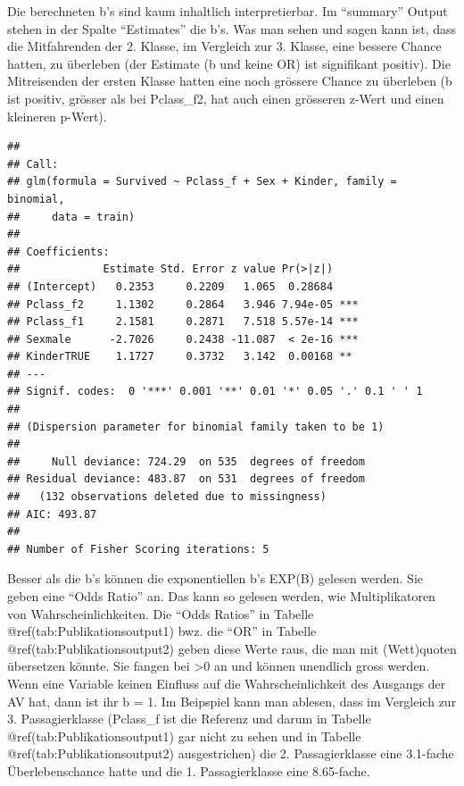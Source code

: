 \documentclass[
  10pt,
  letterpaper,
  a4paper, twoside]{scrreprt}
\begin{document}
Die berechneten b's sind kaum inhaltlich interpretierbar. Im
\enquote{summary} Output stehen in der Spalte \enquote{Estimates} die
b's. Was man sehen und sagen kann ist, dass die Mitfahrenden der 2.
Klasse, im Vergleich zur 3. Klasse, eine bessere Chance hatten, zu
überleben (der Estimate (b und keine OR) ist signifikant positiv). Die
Mitreisenden der ersten Klasse hatten eine noch grössere Chance zu
überleben (b ist positiv, grösser als bei Pclass\_f2, hat auch einen
grösseren z-Wert und einen kleineren p-Wert).

\begin{verbatim}
## 
## Call:
## glm(formula = Survived ~ Pclass_f + Sex + Kinder, family = binomial, 
##     data = train)
## 
## Coefficients:
##             Estimate Std. Error z value Pr(>|z|)    
## (Intercept)   0.2353     0.2209   1.065  0.28684    
## Pclass_f2     1.1302     0.2864   3.946 7.94e-05 ***
## Pclass_f1     2.1581     0.2871   7.518 5.57e-14 ***
## Sexmale      -2.7026     0.2438 -11.087  < 2e-16 ***
## KinderTRUE    1.1727     0.3732   3.142  0.00168 ** 
## ---
## Signif. codes:  0 '***' 0.001 '**' 0.01 '*' 0.05 '.' 0.1 ' ' 1
## 
## (Dispersion parameter for binomial family taken to be 1)
## 
##     Null deviance: 724.29  on 535  degrees of freedom
## Residual deviance: 483.87  on 531  degrees of freedom
##   (132 observations deleted due to missingness)
## AIC: 493.87
## 
## Number of Fisher Scoring iterations: 5
\end{verbatim}

Besser als die b's können die exponentiellen b's EXP(B) gelesen werden.
Sie geben eine \enquote{Odds Ratio} an. Das kann so gelesen werden, wie
Multiplikatoren von Wahrscheinlichkeiten. Die \enquote{Odds Ratios} in
Tabelle @ref(tab:Publikationsoutput1) bwz. die \enquote{OR} in Tabelle
@ref(tab:Publikationsoutput2) geben diese Werte raus, die man mit
(Wett)quoten übersetzen könnte. Sie fangen bei \textgreater0 an und
können unendlich gross werden. Wenn eine Variable keinen Einfluss auf
die Wahrscheinlichkeit des Ausgangs der AV hat, dann ist ihr b = 1. Im
Beipspiel kann man ablesen, dass im Vergleich zur 3. Passagierklasse
(Pclass\_f ist die Referenz und darum in Tabelle
@ref(tab:Publikationsoutput1) gar nicht zu sehen und in Tabelle
@ref(tab:Publikationsoutput2) ausgestrichen) die 2. Passagierklasse eine
3.1-fache Überlebenschance hatte und die 1. Passagierklasse eine
8.65-fache.
\end{document}

